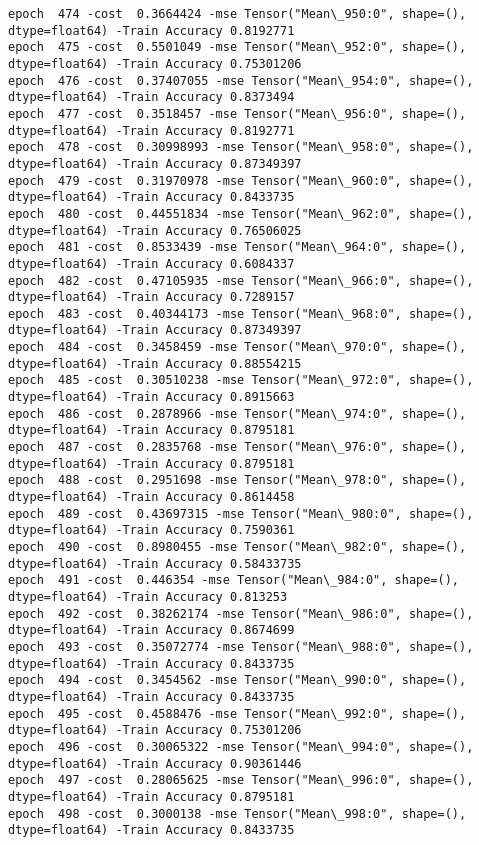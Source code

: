 \documentclass[11pt]{article}
\begin{document}
\begin{Verbatim}[commandchars=\\\{\}]
epoch  474 -cost  0.3664424 -mse Tensor("Mean\_950:0", shape=(), dtype=float64) -Train Accuracy 0.8192771
epoch  475 -cost  0.5501049 -mse Tensor("Mean\_952:0", shape=(), dtype=float64) -Train Accuracy 0.75301206
epoch  476 -cost  0.37407055 -mse Tensor("Mean\_954:0", shape=(), dtype=float64) -Train Accuracy 0.8373494
epoch  477 -cost  0.3518457 -mse Tensor("Mean\_956:0", shape=(), dtype=float64) -Train Accuracy 0.8192771
epoch  478 -cost  0.30998993 -mse Tensor("Mean\_958:0", shape=(), dtype=float64) -Train Accuracy 0.87349397
epoch  479 -cost  0.31970978 -mse Tensor("Mean\_960:0", shape=(), dtype=float64) -Train Accuracy 0.8433735
epoch  480 -cost  0.44551834 -mse Tensor("Mean\_962:0", shape=(), dtype=float64) -Train Accuracy 0.76506025
epoch  481 -cost  0.8533439 -mse Tensor("Mean\_964:0", shape=(), dtype=float64) -Train Accuracy 0.6084337
epoch  482 -cost  0.47105935 -mse Tensor("Mean\_966:0", shape=(), dtype=float64) -Train Accuracy 0.7289157
epoch  483 -cost  0.40344173 -mse Tensor("Mean\_968:0", shape=(), dtype=float64) -Train Accuracy 0.87349397
epoch  484 -cost  0.3458459 -mse Tensor("Mean\_970:0", shape=(), dtype=float64) -Train Accuracy 0.88554215
epoch  485 -cost  0.30510238 -mse Tensor("Mean\_972:0", shape=(), dtype=float64) -Train Accuracy 0.8915663
epoch  486 -cost  0.2878966 -mse Tensor("Mean\_974:0", shape=(), dtype=float64) -Train Accuracy 0.8795181
epoch  487 -cost  0.2835768 -mse Tensor("Mean\_976:0", shape=(), dtype=float64) -Train Accuracy 0.8795181
epoch  488 -cost  0.2951698 -mse Tensor("Mean\_978:0", shape=(), dtype=float64) -Train Accuracy 0.8614458
epoch  489 -cost  0.43697315 -mse Tensor("Mean\_980:0", shape=(), dtype=float64) -Train Accuracy 0.7590361
epoch  490 -cost  0.8980455 -mse Tensor("Mean\_982:0", shape=(), dtype=float64) -Train Accuracy 0.58433735
epoch  491 -cost  0.446354 -mse Tensor("Mean\_984:0", shape=(), dtype=float64) -Train Accuracy 0.813253
epoch  492 -cost  0.38262174 -mse Tensor("Mean\_986:0", shape=(), dtype=float64) -Train Accuracy 0.8674699
epoch  493 -cost  0.35072774 -mse Tensor("Mean\_988:0", shape=(), dtype=float64) -Train Accuracy 0.8433735
epoch  494 -cost  0.3454562 -mse Tensor("Mean\_990:0", shape=(), dtype=float64) -Train Accuracy 0.8433735
epoch  495 -cost  0.4588476 -mse Tensor("Mean\_992:0", shape=(), dtype=float64) -Train Accuracy 0.75301206
epoch  496 -cost  0.30065322 -mse Tensor("Mean\_994:0", shape=(), dtype=float64) -Train Accuracy 0.90361446
epoch  497 -cost  0.28065625 -mse Tensor("Mean\_996:0", shape=(), dtype=float64) -Train Accuracy 0.8795181
epoch  498 -cost  0.3000138 -mse Tensor("Mean\_998:0", shape=(), dtype=float64) -Train Accuracy 0.8433735

\end{Verbatim}
\end{document}
